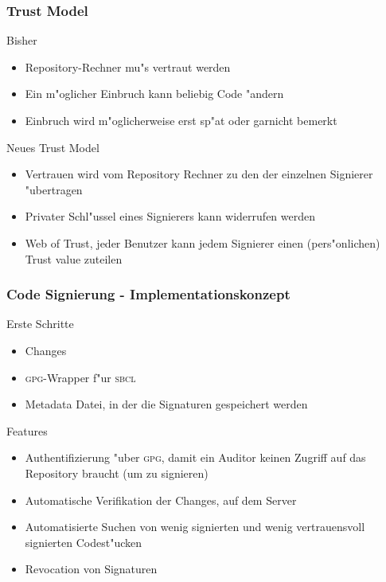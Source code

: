 \documentclass[german]{beamer}
\newcommand{\GPG}{\textsc{gpg}}
\newcommand{\SBCL}{\textsc{sbcl}}
\begin{document}
\begin{frame}
  \frametitle{Trust Model}
  \begin{block}{Bisher}
    \begin{itemize}
      \item Repository-Rechner mu"s vertraut werden
      \item Ein m"oglicher Einbruch kann beliebig Code "andern
      \item Einbruch wird m"oglicherweise erst sp"at oder garnicht bemerkt
    \end{itemize}
  \end{block}
  \begin{block}{Neues Trust Model}
    \begin{itemize}
      \item Vertrauen wird vom Repository Rechner zu den
         der einzelnen Signierer "ubertragen
      \item Privater Schl"ussel eines Signierers kann widerrufen werden
      \item Web of Trust, jeder Benutzer kann jedem Signierer
         einen (pers"onlichen) Trust value zuteilen
    \end{itemize}
  \end{block}
\end{frame}

\begin{frame}
  \frametitle{Code Signierung - Implementationskonzept}
  \begin{block}{Erste Schritte}
    \begin{itemize}
      \item Changes
      \item \GPG{}-Wrapper f"ur \SBCL
      \item Metadata Datei, in der die Signaturen gespeichert werden
    \end{itemize}
  \end{block}
  \begin{block}{Features}
    \begin{itemize}
      \item Authentifizierung "uber \GPG{}, damit ein Auditor keinen Zugriff
        auf das Repository braucht (um zu signieren)
      \item Automatische Verifikation der Changes, auf dem Server
      \item Automatisierte Suchen von wenig signierten und wenig
        vertrauensvoll signierten Codest"ucken
      \item Revocation von Signaturen
    \end{itemize}
  \end{block}
\end{frame}
\end{document}
